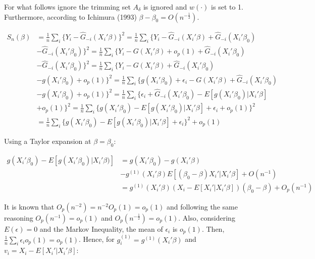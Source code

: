 \documentclass[a4paper]{article}
\newcommand{\norm}[1]{\left\lVert#1\right\rVert}
\begin{document}
For what follows ignore the trimming set $A_\delta$ is ignored and $w(\cdot)$ is set to 1. Furthermore, according to Ichimura (1993) $\beta - \beta_0 = O(n^{-\frac{1}{2}})$. 



\begin{align*}
S_{n}(\beta) & = \frac{1}{n}\sum_i \{ Y_i - \hat{G}_{-i}(X_i'\beta)\}^2 = \frac{1}{n}\sum_i\{Y_i - \hat{G}_{-i}(X_i'\beta) +  \hat{G}_{-i}(X_i'\beta_0) \\
			 & - \hat{G}_{-i}(X_i'\beta_0) \}^2 = \frac{1}{n} \sum_i \{Y_i - G(X_i'\beta) + o_p(1) + \hat{G}_{-i}(X_i'\beta_0) \\
			 & - \hat{G}_{-i}(X_i'\beta_0) \}^2 = \frac{1}{n}\sum_i \{ Y_i - G(X_i'\beta) + \hat{G}_{-i}(X_i'\beta_0) \\
			 & - g(X_i'\beta_0) + o_p(1) \}^2 = \frac{1}{n} \sum_i \{ g(X_i'\beta_0) + \epsilon_i - G(X_i'\beta) + \hat{G}_{-i}(X_i'\beta_0) \\
			 & - g(X_i'\beta_0) + o_p(1) \}^2 = \frac{1}{n} \sum_i \{ \epsilon_i + \hat{G}_{-i}(X_i'\beta_0) - E[g(X_i'\beta_0)|X_i'\beta] \\
			 & + o_p(1) \}^2 = \frac{1}{n}\sum_i \{ g(X_i'\beta_0) - E[g(X_i'\beta_0)|X_i'\beta] +  \epsilon_i + o_p(1)\}^2 \\
			 & = \frac{1}{n}\sum_i \{ g(X_i'\beta_0) - E[g(X_i'\beta_0)|X_i'\beta] +  \epsilon_i\}^2 + o_p(1)
\end{align*}

Using a Taylor expansion at $\beta = \beta_0$:

\begin{align*}
g(X_i'\beta_0) - E[g(X_i'\beta_0)|X_i'\beta)] & = g(X_i'\beta_0) - g(X_i'\beta) \\
											 & - g^{(1)}(X_i'\beta)E[(\beta_0 - \beta)X_i'|X_i'\beta] + O(n^{-1}) \\
				                              & = g^{(1)}(X_i'\beta)( X_i - E[X_i'|X_i'\beta])(\beta_0 - \beta) + O_p(n^{-1})
\end{align*}


It is known that $O_p(n^{-2}) = n^{-2}O_p(1) = o_p(1)$ and following the same reasoning $O_p(n^{-1}) = o_p(1)$ and $O_p(n^{-\frac{1}{2}}) = o_p(1)$. Also, considering $E(\epsilon) = 0$ and the Markov Inequality, the mean of $\epsilon_i$ is $o_p(1)$. Then, $\frac{1}{n}\sum_i\epsilon_io_p(1) = o_p(1)$. Hence, for $g_{i}^{(1)} = g^{(1)}(X_i'\beta)$ and $v_i = X_i - E[X_i'|X_i'\beta]$:
\end{document}
